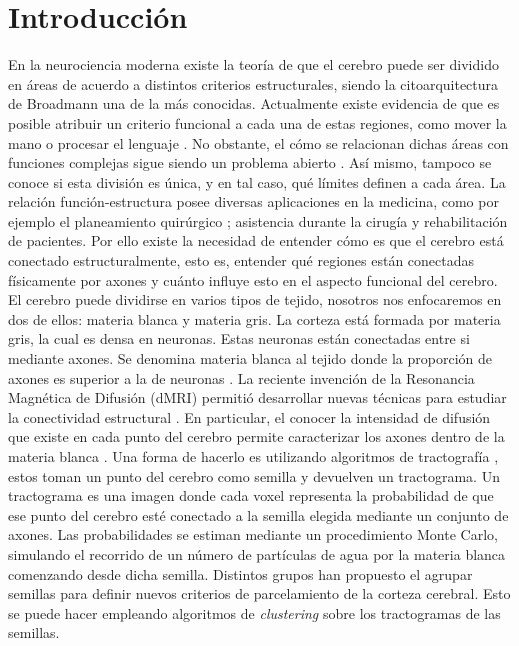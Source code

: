 \chapter{Introducci\'on}

En la neurociencia moderna existe la teor\'ia de que el cerebro
puede ser dividido en \'areas de acuerdo a distintos criterios
estructurales, siendo la citoarquitectura de Broadmann \cite{Brodmann1909}
una de la m\'as conocidas. Actualmente existe evidencia de que es posible
atribuir un criterio funcional a cada una de estas regiones, como mover la
mano o procesar el lenguaje \cite{Greicius2003}. No obstante, el c\'omo se
relacionan dichas \'areas con funciones complejas sigue siendo un problema
abierto \cite{Barch2013}. As\'i mismo, tampoco se conoce si esta divisi\'on
es \'unica, y en tal caso, qu\'e l\'imites definen a cada \'area. La
relaci\'on funci\'on-estructura posee diversas aplicaciones en la
medicina, como por ejemplo el planeamiento quir\'urgico 
\cite{Stufflebeam2011} \cite{Oishi2010}; asistencia durante la cirug\'ia
\cite{DeSchotten2005} y rehabilitaci\'on \cite{Song2014} de pacientes. 
Por ello existe la necesidad de entender c\'omo es que el cerebro est\'a
conectado estructuralmente, esto es, entender qu\'e regiones est\'an
conectadas f\'isicamente por axones y cu\'anto influye esto en el aspecto
funcional del cerebro. \\

El cerebro puede dividirse en varios tipos de tejido, nosotros nos
enfocaremos en dos de ellos: materia blanca y materia gris. La corteza 
est\'a formada por materia gris, la cual es densa en neuronas. Estas
neuronas est\'an conectadas entre si mediante axones. Se denomina materia
blanca al tejido donde la proporci\'on de axones es superior a la de
neuronas \cite{Dale2008}. La reciente invenci\'on de la Resonancia 
Magn\'etica de Difusi\'on (dMRI) permiti\'o desarrollar nuevas t\'ecnicas
para estudiar la conectividad estructural \cite{Taylor1985}. En
particular, el conocer la intensidad de difusi\'on que existe en cada
punto del cerebro permite caracterizar los axones dentro de la materia
blanca \cite{Hagmann2006}. Una forma de hacerlo es utilizando algoritmos
de tractograf\'ia \cite{Descoteaux2009, Jbabdi2007}, estos toman un
punto del cerebro como semilla y devuelven un tractograma. Un tractograma
es una imagen donde cada voxel representa la probabilidad de que ese punto
del cerebro est\'e conectado a la semilla elegida mediante un conjunto de
axones. Las probabilidades se estiman mediante un procedimiento Monte
Carlo, simulando el recorrido de un n\'umero de part\'iculas de agua por
la materia blanca comenzando desde dicha semilla. Distintos grupos han
propuesto el agrupar semillas para definir nuevos criterios de
parcelamiento de la corteza cerebral. Esto se puede hacer empleando algoritmos de \textit{clustering} sobre los tractogramas de las semillas.\\

